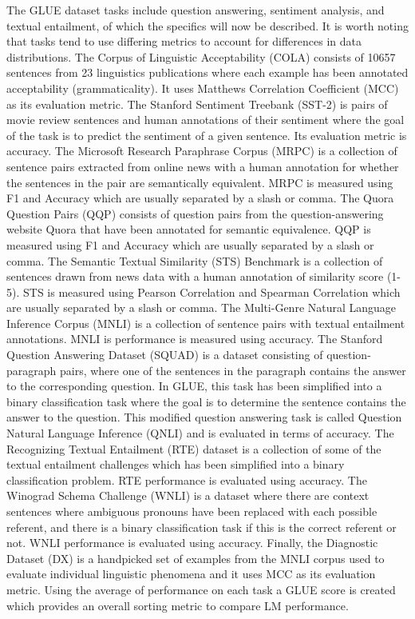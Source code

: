 The GLUE dataset tasks include question answering, sentiment analysis, and textual entailment, of which the specifics will now be described. It is worth noting that tasks tend to use differing metrics to account for differences in data distributions. The Corpus of Linguistic Acceptability (COLA) \cite{Warstadt2019NeuralNA} consists of 10657 sentences from 23 linguistics publications where each example has been annotated acceptability (grammaticality). It uses Matthews Correlation Coefficient (MCC) as its evaluation metric. The Stanford Sentiment Treebank (SST-2) \cite{Socher2013RecursiveDM} is pairs of movie review sentences and human annotations of their sentiment where the goal of the task is to predict the sentiment of a given sentence. Its evaluation metric is accuracy. The Microsoft Research Paraphrase Corpus (MRPC) \cite{Dolan2005AutomaticallyCA} is a collection of sentence pairs extracted from online news with a human annotation for whether the sentences in the pair are semantically equivalent. MRPC is measured using F1 and Accuracy which are usually separated by a slash or comma. The Quora Question Pairs (QQP) \cite{QQP} consists of question pairs from the question-answering website Quora that have been annotated for semantic equivalence. QQP is measured using F1 and Accuracy which are usually separated by a slash or comma. The Semantic Textual Similarity (STS) Benchmark \cite{Cer2017SemEval2017T1} is a collection of sentences drawn from news data with a human annotation of similarity score (1-5). STS is measured using Pearson Correlation and Spearman Correlation which are usually separated by a slash or comma. The Multi-Genre Natural Language Inference Corpus (MNLI) \cite{Williams2018ABC} is a collection of sentence pairs with textual entailment annotations. MNLI is performance is measured using accuracy. The Stanford Question Answering Dataset (SQUAD) \cite{Rajpurkar2016SQuAD10} is a dataset consisting of question-paragraph pairs, where one of the sentences in the paragraph contains the answer to the corresponding question. In GLUE, this task has been simplified into a binary classification task where the goal is to determine the sentence contains the answer to the question. This modified question answering task is called Question Natural Language Inference (QNLI) and is evaluated in terms of accuracy. The Recognizing Textual Entailment (RTE) dataset is a collection of some of the textual entailment challenges \cite{Dagan2005ThePR} \cite{BarHaim2006TheSP} \cite{Giampiccolo2007TheTP}\cite{Bentivogli2009TheSP} which has been simplified into a binary classification problem. RTE performance is evaluated using accuracy. The Winograd Schema Challenge (WNLI) \cite{Levesque2011TheWS} is a dataset where there are context sentences where ambiguous pronouns have been replaced with each possible referent, and there is a binary classification task if this is the correct referent or not. WNLI performance is evaluated using accuracy. Finally, the Diagnostic Dataset (DX) is a handpicked set of examples from the MNLI corpus used to evaluate individual linguistic phenomena and it uses MCC as its evaluation metric. Using the average of performance on each task a GLUE score is created which provides an overall sorting metric to compare LM performance. \\ 
